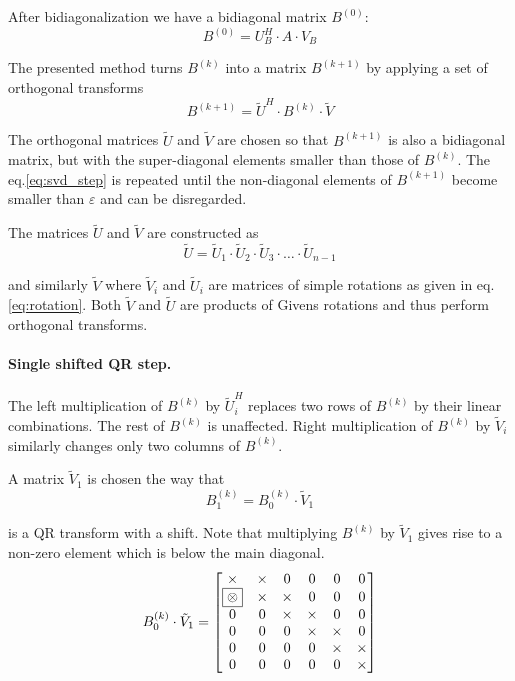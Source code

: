 \addvspace{12pt}

After bidiagonalization we have a bidiagonal matrix $B^{(0)}$:
\begin{equation}
B^{(0)} = U_B^H \cdot A \cdot V_B
\end{equation}

The presented method turns $B^{(k)}$ into a matrix $B^{(k+1)}$ by
applying a set of orthogonal transforms
\begin{equation}
\label{eq:svd_step}
B^{(k+1)} = \tilde{U}^H\cdot B^{(k)} \cdot \tilde{V}
\end{equation}

The orthogonal matrices $\tilde{U}$ and $\tilde{V}$ are chosen so that
$B^{(k+1)}$ is also a bidiagonal matrix, but with the super-diagonal
elements smaller than those of $B^{(k)}$.  The eq.\eqref{eq:svd_step}
is repeated until the non-diagonal elements of $B^{(k+1)}$ become
smaller than $\varepsilon$ and can be disregarded.

\addvspace{12pt}

The matrices $\tilde{U}$ and $\tilde{V}$ are constructed as
\begin{equation}
\tilde{U} = \tilde{U}_1 \cdot \tilde{U}_2 \cdot \tilde{U}_3\cdot \dots \cdot \tilde{U}_{n-1}
\end{equation}

and similarly $\tilde{V}$ where $\tilde{V}_i$ and $\tilde{U}_i$ are
matrices of simple rotations as given in eq.\eqref{eq:rotation}.  Both
$\tilde{V}$ and $\tilde{U}$ are products of Givens rotations and thus
perform orthogonal transforms.

\paragraph{Single shifted QR step.}

The left multiplication of $B^{(k)}$ by $\tilde{U}_i^H$ replaces two
rows of $B^{(k)}$ by their linear combinations.  The rest of $B^{(k)}$
is unaffected.  Right multiplication of $B^{(k)}$ by $\tilde{V}_i$
similarly changes only two columns of $B^{(k)}$.

\addvspace{12pt}

A matrix $\tilde{V}_1$ is chosen the way that
\begin{equation}
B^{(k)}_1 = B^{(k)}_0 \cdot \tilde{V}_1
\end{equation}
 
is a QR transform with a shift.  Note that multiplying $B^{(k)}$ by
$\tilde{V}_1$ gives rise to a non-zero element which is below the main
diagonal.
\begin{equation}
B^{(k)}_0 \cdot \tilde{V}_1 =
\begin{bmatrix}
\times & \times & 0 & 0 & 0 & 0\\
\framebox{$\otimes$} & \times & \times & 0 & 0 & 0\\
0 & 0 & \times & \times & 0 & 0\\
0 & 0 & 0 & \times & \times & 0\\
0 & 0 & 0 & 0 & \times & \times\\
0 & 0 & 0 & 0  & 0 & \times\\
\end{bmatrix}
\end{equation}

